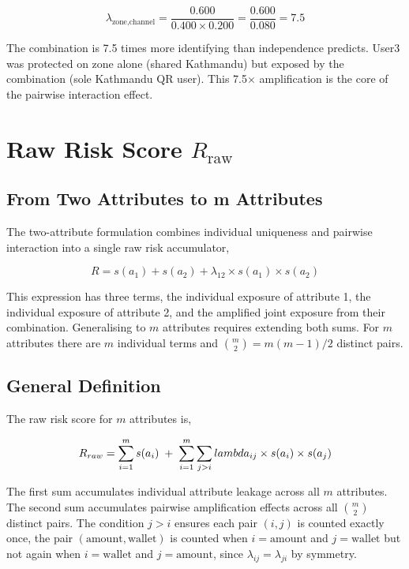 \begin{equation*}
\lambda_{\text{zone,channel}} =
\frac{0.600}{0.400 \times 0.200} = \frac{0.600}{0.080}
= 7.5
\end{equation*}

The combination is 7.5 times more identifying than
independence predicts. User3 was protected on zone alone
(shared Kathmandu) but exposed by the combination
(sole Kathmandu QR user). This 7.5$\times$ amplification
is the core of the pairwise interaction effect.

\section{Raw Risk Score \texorpdfstring{$R_{\mathrm{raw}}$}{R\_raw}}
\label{sec:r_raw}

\subsection{From Two Attributes to m Attributes}

The two-attribute formulation combines individual
uniqueness and pairwise interaction into a single
raw risk accumulator,

\begin{equation}
R = s(a_1) + s(a_2) + \lambda_{12} \times s(a_1) \times s(a_2)
\label{eq:r_two}
\end{equation}

This expression has three terms, the individual exposure
of attribute 1, the individual exposure of attribute 2,
and the amplified joint exposure from their combination.
Generalising to $m$ attributes requires extending both
sums. For $m$ attributes there are $m$ individual terms
and $\binom{m}{2} = m(m-1)/2$ distinct pairs.

\subsection{General Definition}

The raw risk score for $m$ attributes is,

\begin{equation}
R_{raw} = \sum_{i=1}^{m} s(a_i)
\;+\;
\sum_{i=1}^{m} \sum_{j > i} lambda_{ij} \times s(a_i) \times s(a_j)
\label{eq:r_raw}
\end{equation}

The first sum accumulates individual attribute leakage
across all $m$ attributes. The second sum accumulates
pairwise amplification effects across all $\binom{m}{2}$
distinct pairs. The condition $j > i$ ensures each pair
$(i,j)$ is counted exactly once, the pair
$(\text{amount}, \text{wallet})$ is counted when $i =
\text{amount}$ and $j = \text{wallet}$ but not again
when $i = \text{wallet}$ and $j = \text{amount}$, since
$\lambda_{ij} = \lambda_{ji}$ by symmetry.

